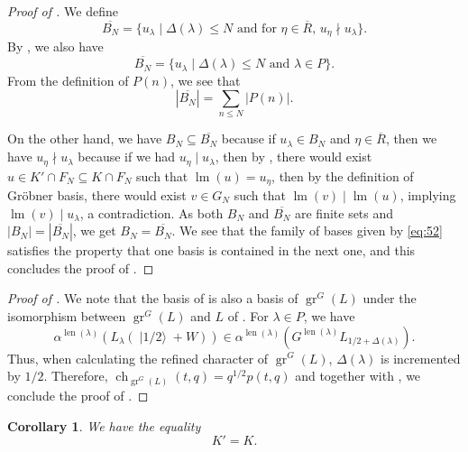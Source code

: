 \documentclass[a4paper, 12pt, reqno]{amsart}
\newtheorem{corollary}[theorem]{Corollary}
\theoremstyle{remark}
\DeclareMathOperator{\gr}{gr}
\DeclareMathOperator{\ch}{ch}
\DeclareMathOperator{\lm}{lm}
\DeclareMathOperator{\len}{len}
\DeclareMathOperator{\vachalf}{|1/2\rangle}
\begin{document}
\begin{proof}[Proof of ]
  We define
  \begin{equation*}
    \overline{B_N} = \{u_{\lambda} \mid \text{$\Delta(\lambda) \le N$ and for $\eta \in \overline{R}$, $u_{\eta} \nmid u_{\lambda}$}\}.
  \end{equation*}
  By , we also have
  \begin{equation*}
    \overline{B_N} = \{u_{\lambda} \mid \text{$\Delta(\lambda) \le N$ and $\lambda \in P$}\}.
  \end{equation*}
  From the definition of $P(n)$, we see that
  \begin{equation*}
    |\overline{B_N}| = \sum_{n \le N}|P(n)|.
  \end{equation*}

  On the other hand, we have $B_N \subseteq \overline{B_N}$ because if $u_{\lambda} \in B_N$ and $\eta \in \overline{R}$, then we have $u_{\eta} \nmid u_{\lambda}$ because if we had $u_{\eta} \mid u_{\lambda}$, then by , there would exist $u \in K' \cap F_N \subseteq K \cap F_N$ such that $\lm(u) = u_{\eta}$, then by the definition of Gröbner basis, there would exist $v \in G_N$ such that $\lm(v) \mid \lm(u)$, implying $\lm(v) \mid u_{\lambda}$, a contradiction.
  As both $B_N$ and $\overline{B_N}$ are finite sets and $|B_N| = |\overline{B_N}|$, we get $B_N = \overline{B_N}$.
  We see that the family of bases given by \eqref{eq:52} satisfies the property that one basis is contained in the next one, and this concludes the proof of .
\end{proof}

\begin{proof}[Proof of ]
  We note that the basis of  is also a basis of $\gr^G(L)$ under the isomorphism between $\gr^G(L)$ and $L$ of .
  For $\lambda \in P$, we have
  \begin{equation*}
    \alpha^{\len(\lambda)}(L_{\lambda}(\vachalf + W)) \in \alpha^{\len(\lambda)}(G^{\len(\lambda)}L_{1/2 + \Delta(\lambda)}).
  \end{equation*}
  Thus, when calculating the refined character of $\gr^G(L)$, $\Delta(\lambda)$ is incremented by $1/2$.
  Therefore, $\ch_{\gr^G(L)}(t, q) = q^{1/2}p(t, q)$ and together with , we conclude the proof of .
\end{proof}

\begin{corollary}
  \label{crl:3}
  We have the equality
  \begin{equation*}
    K' = K.
  \end{equation*}
\end{corollary}
\end{document}
